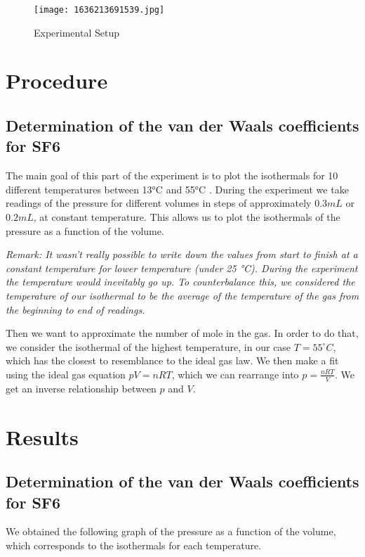 \documentclass{scrartcl}
\begin{document}
\begin{figure}[htbp]
    \centering
    \texttt{[image: 1636213691539.jpg]}
    \caption{Experimental Setup}
    \label{fig:2}
\end{figure}

\section{Procedure}

\subsection{Determination of the van der Waals coefficients for SF6}

The main goal of this part of the experiment is to plot the isothermals for 10 different temperatures between 13°C and 55°C . During the experiment we take readings of the pressure for different volumes in steps of approximately $0.3mL$ or $0.2mL$, at constant temperature. This allows us to plot the isothermals of the pressure as a function of the volume.

\medskip

\textit{Remark: It wasn't really possible to write down the values from start to finish at a constant temperature for lower temperature (under 25 °C). During the experiment the temperature would inevitably go up. To counterbalance this, we considered the temperature of our isothermal to be the average of the temperature of the gas from the beginning to end of readings.}

\medskip

Then we want to approximate the number of mole in the gas. In order to do that, we consider the isothermal of the highest temperature, in our case $T = 55^{\circ}C$, which has the closest to resemblance to the ideal gas law. We then make a fit using the ideal gas equation $pV=nRT$, which we can rearrange into $p =  \frac{nRT}{V}$. We get an inverse relationship between $p$ and $V$. 

\section{Results}

\subsection{Determination of the van der Waals coefficients for SF6}
We obtained the following graph of the pressure as a function of the volume, which corresponds to the isothermals for each temperature.
\end{document}
